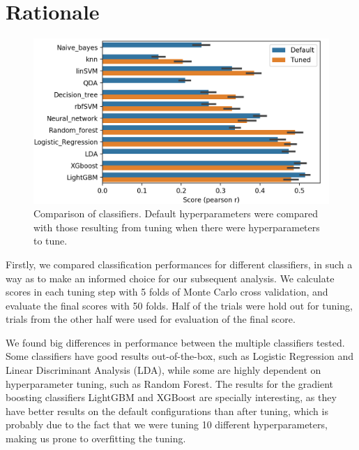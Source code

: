 \section{Rationale}
    \begin{figure}
        \centering
        \includegraphics[width=\textwidth]{figures/clf_comparison.png}
        \caption[Comparison of classifiers]{Comparison of classifiers. Default hyperparameters were compared with those resulting from tuning when there were hyperparameters to tune.}
        \label{fig:clf_comparison}
    \end{figure} %
    Firstly, we compared classification performances for different classifiers, in such a way as to make an informed choice for our subsequent analysis. We calculate scores in each tuning step with 5 folds of Monte Carlo cross validation, and evaluate the final scores with 50 folds. Half of the trials were hold out for tuning, trials from the other half were used for evaluation of the final score.
    
    We found big differences in performance between the multiple classifiers tested. Some classifiers have good results out-of-the-box, such as Logistic Regression and Linear Discriminant Analysis (LDA), while some are highly dependent on hyperparameter tuning, such as Random Forest. The results for the gradient boosting classifiers LightGBM and XGBoost are specially interesting, as they have better results on the default configurations than after tuning, which is probably due to the fact that we were tuning 10 different hyperparameters, making us prone to overfitting the tuning.
    
